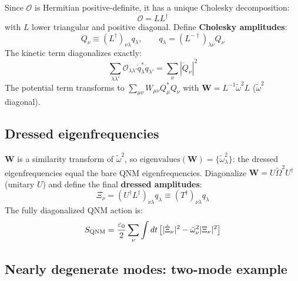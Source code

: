 \documentclass[12pt]{article}
\newcommand{\QNM}{{\rm QNM}}
\newcommand{\tomega}{\tilde{\omega}}
\begin{document}
Since $\mathcal{O}$ is Hermitian positive-definite, it has a unique
Cholesky decomposition:
\begin{equation}
  \mathcal{O} = LL^\dagger
  \label{eq:cholesky}
\end{equation}
with $L$ lower triangular and positive diagonal.  Define
\textbf{Cholesky amplitudes}:
\begin{equation}
  Q_\nu \equiv (L^\dagger)_{\nu\lambda}q_\lambda,\qquad
  q_\lambda = (L^{-\dagger})_{\lambda\nu}Q_\nu
  \label{eq:cholesky_coords}
\end{equation}
The kinetic term diagonalizes exactly:
\begin{equation}
  \sum_{\lambda\lambda'}\mathcal{O}_{\lambda\lambda'}\dot{q}_\lambda^*\dot{q}_{\lambda'}
  = \sum_\nu|\dot{Q}_\nu|^2
  \label{eq:kinetic_diag}
\end{equation}
The potential term transforms to $\sum_{\mu\nu}W_{\mu\nu}Q_\mu^*Q_\nu$
with $\mathbf{W}=L^{-1}\tilde{\omega}^2 L$ ($\tilde{\omega}^2$ diagonal).

\subsection{Dressed eigenfrequencies}

$\mathbf{W}$ is a similarity transform of $\tilde{\omega}^2$, so
$\mathrm{eigenvalues}(\mathbf{W})=\{\tilde{\omega}_\lambda^2\}$: the
dressed eigenfrequencies equal the bare QNM eigenfrequencies.  Diagonalize
$\mathbf{W}=U\tilde{\Omega}^2 U^\dagger$ (unitary $U$) and define the
final \textbf{dressed amplitudes}:
\begin{equation}
  \Xi_\nu = (U^\dagger L^\dagger)_{\nu\lambda}q_\lambda \equiv
  (T^\dagger)_{\nu\lambda}q_\lambda
  \label{eq:dressed_amps}
\end{equation}
The fully diagonalized QNM action is:
\begin{equation}
  S_\QNM = \frac{\varepsilon_0}{2}\sum_\nu\int dt
  \left[|\dot{\Xi}_\nu|^2-\tomega_\nu^2|\Xi_\nu|^2\right]
  \label{eq:diagonal_action}
\end{equation}

\subsection{Nearly degenerate modes: two-mode example}
\end{document}
